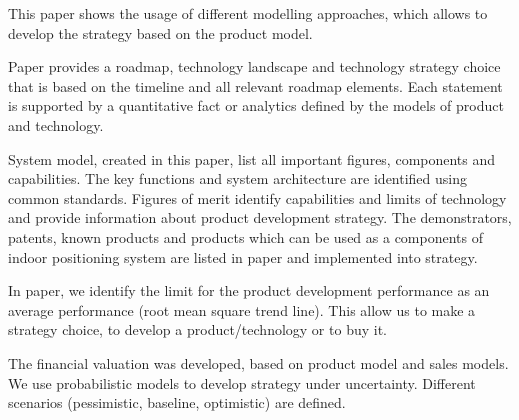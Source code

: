 \documentclass[conference]{IEEEtran}
\begin{document}
This paper shows the usage of different modelling approaches, which allows to develop the strategy based on the product model.

Paper provides a roadmap, technology landscape and technology strategy choice that is based on the timeline and all relevant roadmap elements. 
Each statement is supported by a quantitative fact or analytics defined by the models of product and technology.

System model, created in this paper, list all important figures, components and capabilities. The key functions and system architecture are identified using common standards. Figures of merit identify capabilities and limits of technology and provide information about product development strategy. The demonstrators, patents, known products and products which can be used as a components of indoor positioning system are listed in paper and implemented into strategy.

In paper, we identify the limit for the product development performance as an average performance (root mean square trend line). This allow us to make a strategy choice, to develop a product/technology or to buy it. 

The financial valuation was developed, based on product model and sales models.
We use probabilistic models to develop strategy under uncertainty. Different scenarios (pessimistic, baseline, optimistic) are defined. 





% 

\end{document}
